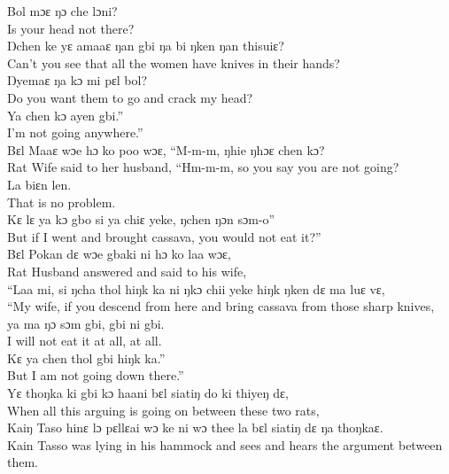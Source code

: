 Bol mɔɛ ŋɔ che lɔni?\\
Is your head not there?\\

Ŋchen ke yɛ amaaɛ ŋan gbi ŋa bi ŋken ŋan thisuiɛ?\\
Can’t you see that all the women have knives in their hands?\\

Ŋyemaɛ ŋa kɔ mi pɛl bol?\\
Do you want them to go and crack my head?\\

Ya chen kɔ ayen gbi.”\\
I’m not going anywhere.”\\

Bɛl Maaɛ wɔe hɔ ko poo wɔɛ, “M-m-m, ŋhie ŋhɔɛ chen kɔ?\\
Rat Wife said to her husband, “Hm-m-m, so you say you are not going?\\

La biɛn len.\\
That is no problem.\\

Kɛ lɛ ya kɔ gbo si ya chiɛ yeke, ŋchen ŋɔn sɔm-o”\\
But if I went and brought cassava, you would not eat it?”\\

Bɛl Pokan dɛ wɔe gbaki ni hɔ ko laa wɔɛ,\\
Rat Husband answered and said to his wife,\\

“Laa mi, si ŋcha thol hiŋk ka ni ŋkɔ chii yeke hiŋk ŋken dɛ ma luɛ vɛ,\\
“My wife, if you descend from here and bring cassava from those sharp knives,\\

ya ma ŋɔ sɔm gbi, gbi ni gbi.\\
I will not eat it at all, at all.\\

Kɛ ya chen thol gbi hiŋk ka.”\\
But I am not going down there.”\\

Yɛ thoŋka ki gbi kɔ haani bɛl siatiŋ do ki thiyeŋ dɛ,\\
When all this arguing is going on between these two rats,\\

Kaiŋ Taso hinɛ lɔ pɛllɛai wɔ ke ni wɔ thee la bɛl siatiŋ dɛ ŋa thoŋkaɛ.\\
Kain Tasso was lying in his hammock and sees and hears the argument between them.\\

